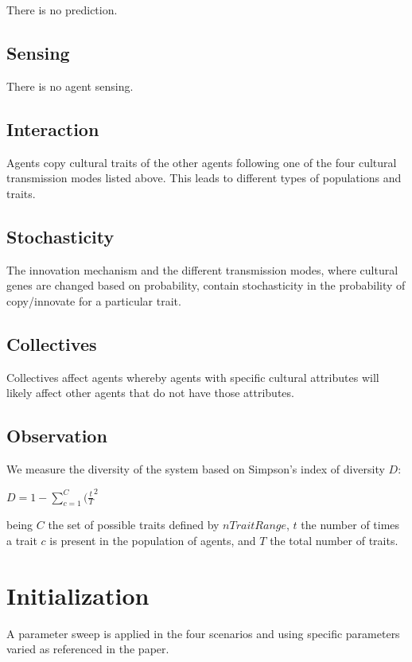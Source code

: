 \documentclass[11pt,a4paper,twocolumn,notitlepage]{article}
\begin{document}
There is no prediction.

\subsection{Sensing}

There is no agent sensing.

\subsection{Interaction}

Agents copy cultural traits of the other agents following one of the four cultural transmission modes listed above. This leads to different types of populations and traits. 

\subsection{Stochasticity}

The innovation mechanism and the different transmission modes, where cultural genes are changed based on probability, contain stochasticity in the probability of copy/innovate for a particular trait. 

\subsection{Collectives}

Collectives affect agents whereby agents with specific cultural attributes will likely affect other agents that do not have those attributes.

\subsection{Observation}

We measure the diversity of the system based on Simpson's index of diversity $D$:

$D = 1 - \sum\limits_{c=1}^C{(\frac{t}{T}^2}$

being $C$ the set of possible traits defined by $nTraitRange$, $t$ the number of times a trait $c$ is present in the population of agents, and $T$ the total number of traits.

\section{Initialization}

A parameter sweep is applied in the four scenarios and using specific parameters varied as referenced in the paper.
\end{document}
